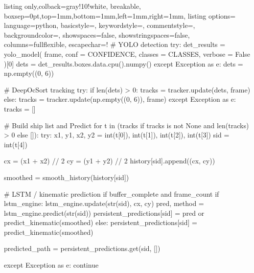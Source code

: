 \begin{tcblisting}{listing only,colback=gray!10!white, breakable, boxsep=0pt,top=1mm,bottom=1mm,left=1mm,right=1mm,
listing options={
language=python,
basicstyle=\small\ttfamily, 
keywordstyle=\color{blue}, 
commentstyle=\color{gray},
backgroundcolor=\color{gray!25},
showspaces=false,
showstringspaces=false,
columns=fullflexible,
escapechar=!}}
# YOLO detection 
try:
    det_results = yolo_model(
        frame,
        conf    = CONFIDENCE,
        classes = CLASSES,
        verbose = False
    )[0]
    dets = det_results.boxes.data.cpu().numpy()
except Exception as e:
    dets = np.empty((0, 6))

# DeepOcSort tracking
try:
    if len(dets) > 0:
        tracks = tracker.update(dets, frame)
    else:
        tracks = tracker.update(np.empty((0, 6)), frame)
except Exception as e:
    tracks = []

# Build ship list and Predict
for t in (tracks if tracks is not None and len(tracks) > 0 else []):
    try:
        x1, y1, x2, y2 = int(t[0]), int(t[1]), int(t[2]), int(t[3])
        sid            = int(t[4])

        cx = (x1 + x2) // 2
        cy = (y1 + y2) // 2
        history[sid].append((cx, cy))

        smoothed = smooth_history(history[sid])

        # LSTM / kinematic prediction
        if buffer_complete and frame_count %
            if lstm_engine:
                lstm_engine.update(str(sid), cx, cy)
                pred, method = lstm_engine.predict(str(sid))
                persistent_predictions[sid] = pred or predict_kinematic(smoothed)
            else:
                persistent_predictions[sid] = predict_kinematic(smoothed)
        
        predicted_path = persistent_predictions.get(sid, [])
        
    except Exception as e:
        continue
\end{tcblisting}
